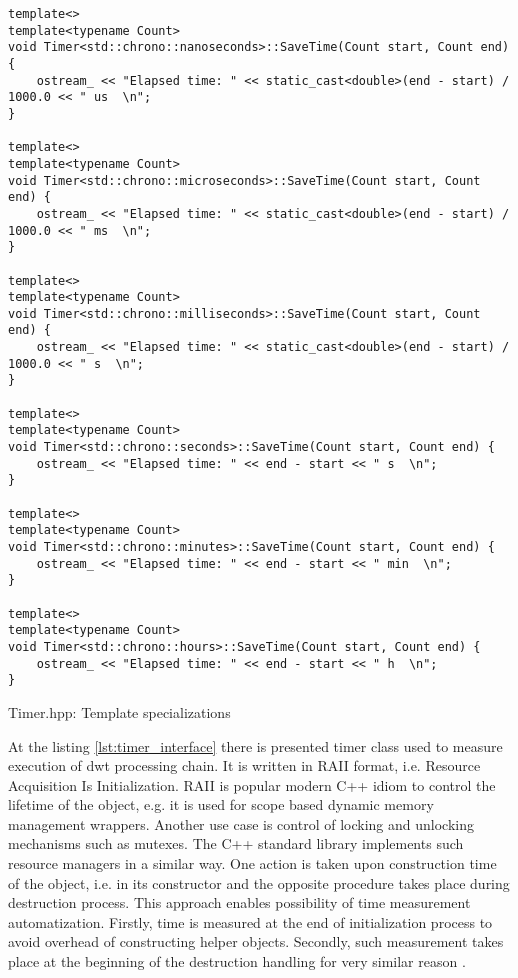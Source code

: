 \begin{listing}[htb]
\begin{verbatim}
template<>
template<typename Count>
void Timer<std::chrono::nanoseconds>::SaveTime(Count start, Count end) {
    ostream_ << "Elapsed time: " << static_cast<double>(end - start) / 1000.0 << " us  \n";
}

template<>
template<typename Count>
void Timer<std::chrono::microseconds>::SaveTime(Count start, Count end) {
    ostream_ << "Elapsed time: " << static_cast<double>(end - start) / 1000.0 << " ms  \n";
}

template<>
template<typename Count>
void Timer<std::chrono::milliseconds>::SaveTime(Count start, Count end) {
    ostream_ << "Elapsed time: " << static_cast<double>(end - start) / 1000.0 << " s  \n";
}

template<>
template<typename Count>
void Timer<std::chrono::seconds>::SaveTime(Count start, Count end) {
    ostream_ << "Elapsed time: " << end - start << " s  \n";
}

template<>
template<typename Count>
void Timer<std::chrono::minutes>::SaveTime(Count start, Count end) {
    ostream_ << "Elapsed time: " << end - start << " min  \n";
}

template<>
template<typename Count>
void Timer<std::chrono::hours>::SaveTime(Count start, Count end) {
    ostream_ << "Elapsed time: " << end - start << " h  \n";
}
\end{verbatim}
\caption{Timer.hpp: Template specializations}
\label{lst:timer_specializations}
\end{listing}

At the listing \ref{lst:timer_interface} there is presented timer class used to measure execution of dwt
processing chain. It is written in RAII format, i.e. Resource Acquisition Is Initialization. RAII is 
popular modern C++ idiom to control the lifetime of the object, e.g. it is used for scope based
dynamic memory management wrappers. Another use case is control of locking and unlocking mechanisms such
as mutexes. The C++ standard library implements such resource managers in a similar way. One action
is taken upon construction time of the object, i.e. in its constructor and the opposite procedure
takes place during destruction process. This approach enables possibility of time measurement automatization.
Firstly, time is measured at the end of initialization process to avoid overhead of constructing helper
objects. Secondly, such measurement takes place at the beginning of the destruction handling for
very similar reason \cite{cppreference}.

